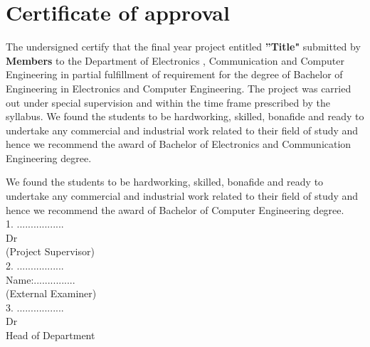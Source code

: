 \documentclass[12pt]{article}
\begin{document}



\section*{Certificate of approval}
\par
The undersigned certify that the final year project entitled \textbf{”Title"} submitted by \textbf{Members} to the Department of Electronics , Communication and Computer Engineering in partial fulfillment of requirement for the degree of Bachelor of Engineering in Electronics and Computer Engineering. The project was carried out under special supervision and within the time frame prescribed by the syllabus. We found the students to be hardworking, skilled, bonafide and ready to undertake any commercial and industrial work related to their field of study and hence we recommend the award of Bachelor of Electronics and Communication Engineering degree.
\par
We found the students to be hardworking, skilled, bonafide and ready to undertake any commercial and industrial work related to their field of study and hence we recommend the award of Bachelor of Computer Engineering degree.\\[1cm]
1. ................. \\
Dr  \\
(Project Supervisor) \\[1cm]
2. ................. \\
Name:............... \\
(External Examiner) \\[1cm]
3. ................. \\
Dr  \\
Head of Department
\clearpage
\end{document}
